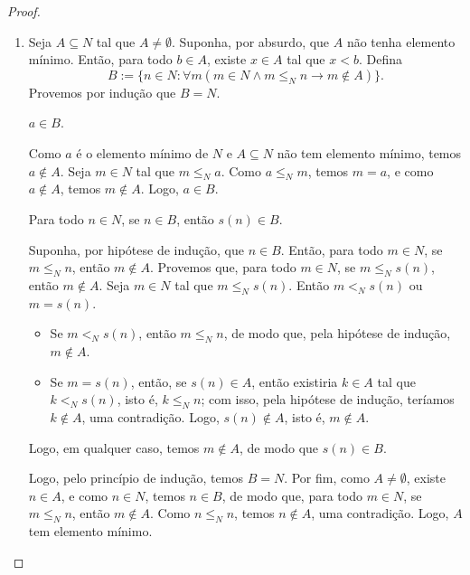 \begin{proof}
\begin{enumerate}[leftmargin=*, align=left, label=\textbf{(\alph*)}]
            \item Seja $A \subseteq N$ tal que $A \neq \emptyset$. Suponha, por absurdo, que $A$ não tenha elemento mínimo. Então, para todo $b \in A$, existe $x \in A$ tal que $x < b$. Defina
                \[
                    B := \{n \in N : \forall m (m \in N \land m \leq_N n \rightarrow m \notin A)\}.
                \]
            Provemos por indução que $B = N$.
                \begin{claim}
                    $a \in B$.
                \end{claim}
                \begin{midproof}
                    Como $a$ é o elemento mínimo de $N$ e $A \subseteq N$ não tem elemento mínimo, temos $a \notin A$. Seja $m \in N$ tal que $m \leq_N a$. Como $a \leq_N m$, temos $m = a$, e como $a \notin A$, temos $m \notin A$. Logo, $a \in B$. \whiteproof
                \end{midproof}
                \begin{claim}
                    Para todo $n \in N$, se $n \in B$, então $s(n) \in B$.
                \end{claim}
                \begin{midproof}
                    Suponha, por hipótese de indução, que $n \in B$. Então, para todo $m \in N$, se $m \leq_N n$, então $m \notin A$. Provemos que, para todo $m \in N$, se $m \leq_N s(n)$, então $m \notin A$. Seja $m \in N$ tal que $m \leq_N s(n)$. Então $m <_N s(n)$ ou $m = s(n)$.
                        \begin{itemize}
                            \item Se $m <_N s(n)$, então $m \leq_N n$, de modo que, pela hipótese de indução, $m \notin A$.
                            \item Se $m = s(n)$, então, se $s(n) \in A$, então existiria $k \in A$ tal que $k <_N s(n)$, isto é, $k \leq_N n$; com isso, pela hipótese de indução, teríamos $k \notin A$, uma contradição. Logo, $s(n) \notin A$, isto é, $m \notin A$.
                        \end{itemize}
                    Logo, em qualquer caso, temos $m \notin A$, de modo que $s(n) \in B$. \whiteproof
                \end{midproof}
            Logo, pelo princípio de indução, temos $B = N$. Por fim, como $A \neq \emptyset$, existe $n \in A$, e como $n \in N$, temos $n \in B$, de modo que, para todo $m \in N$, se $m \leq_N n$, então $m \notin A$. Como $n \leq_N n$, temos $n \notin A$, uma contradição. Logo, $A$ tem elemento mínimo. \blackproof

\end{enumerate}
\end{proof}
